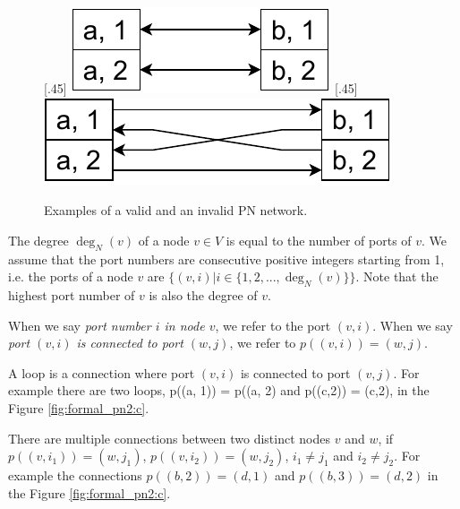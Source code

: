 \begin{figure}[H]
    [.45\linewidth] {
    \centering
    \includegraphics[scale=0.6]{diagrams/formalizing_pn_network_diagram1.pdf}
  }
  \hfill
    [.45\linewidth] {
    \centering
    \includegraphics[scale=0.6]{diagrams/formalizing_pn_network_diagram2.pdf}
  }
  \caption{Examples of a valid and an invalid PN network.}
  \label{fig:formal_pn1}
\end{figure}


The degree $\deg_N(v)$ of a node $v \in V$ is equal to the number of ports of $v$.
We assume that the port numbers are consecutive positive integers starting from 1, i.e. the ports of a node $v$ are $\{(v, i) | i \in \{1, 2, ..., \deg_N(v)\}\}$.
Note that the highest port number of $v$ is also the degree of $v$.

When we say \emph{port number $i$ in node $v$}, we refer to the port $(v, i)$.
When we say \emph{port $(v, i)$ is connected to port $(w, j)$}, we refer to $p((v, i)) = (w, j)$.

A loop is a connection where port $(v, i)$ is connected to port $(v, j)$.
For example there are two loops, p((a, 1)) = p((a, 2) and p((c,2)) = (c,2), in the Figure \ref{fig:formal_pn2:c}.

There are multiple connections between two distinct nodes $v$ and $w$, if $p((v, i_1)) = (w, j_1)$, $p((v, i_2)) = (w, j_2)$, $i_1 \neq j_1$ and $i_2 \neq j_2$.
For example the connections $p((b, 2)) = (d, 1)$ and $p((b, 3)) = (d, 2)$ in the Figure \ref{fig:formal_pn2:c}.

